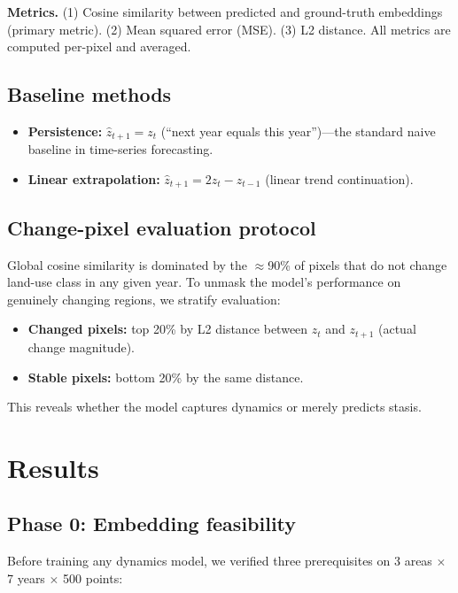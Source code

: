 \documentclass{article}
\begin{document}
\textbf{Metrics.} (1) Cosine similarity between predicted and ground-truth embeddings (primary metric). (2) Mean squared error (MSE). (3) L2 distance. All metrics are computed per-pixel and averaged.

\subsection{Baseline methods}

\begin{itemize}
\item \textbf{Persistence:} $\hat{z}_{t+1} = z_t$ (``next year equals this year'')---the standard naive baseline in time-series forecasting.
\item \textbf{Linear extrapolation:} $\hat{z}_{t+1} = 2z_t - z_{t-1}$ (linear trend continuation).
\end{itemize}

\subsection{Change-pixel evaluation protocol}

Global cosine similarity is dominated by the $\approx$90\% of pixels that do not change land-use class in any given year. To unmask the model's performance on genuinely changing regions, we stratify evaluation:
\begin{itemize}
\item \textbf{Changed pixels:} top 20\% by L2 distance between $z_t$ and $z_{t+1}$ (actual change magnitude).
\item \textbf{Stable pixels:} bottom 20\% by the same distance.
\end{itemize}
This reveals whether the model captures dynamics or merely predicts stasis.


\section{Results}
\label{sec:results}

\subsection{Phase 0: Embedding feasibility}

Before training any dynamics model, we verified three prerequisites on 3 areas $\times$ 7 years $\times$ 500 points:
\end{document}
